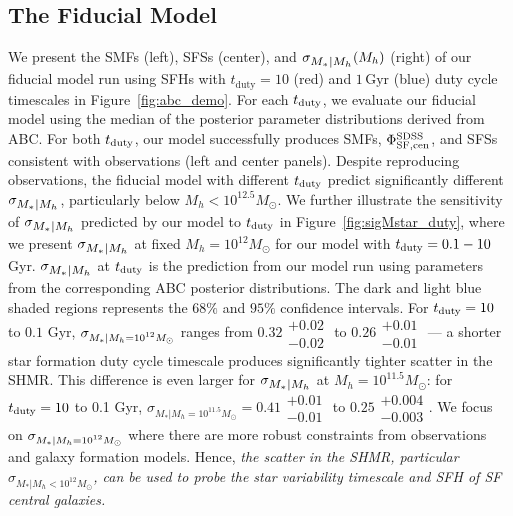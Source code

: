 \documentclass[12pt, letterpaper, preprint, tighten]{aastex62}
\newcommand{\edt}[1]{{\color{dred}{\bf} #1}}
\newcommand{\tduty}{t_{\rm duty}}
\newcommand{\siglogm}{\sigma_{\scaleto{M_*|M_h}{8pt}}}
\newcommand{\sigtwe}{\sigma_{\scaleto{M_*|M_h=10^{12}M_\odot}{8pt}}}
\begin{document}
\subsection{The Fiducial Model} \label{sec:sfdutycycle}
We present the SMFs (left), SFSs (center), and $\siglogm(M_h)$ (right) of our 
fiducial model run using SFHs with 
$t_\mathrm{duty}{=}10$ (red) and $1\,\mathrm{Gyr}$ (blue) duty cycle timescales 
in Figure~\ref{fig:abc_demo}. %
For each $\tduty$, we evaluate our fiducial model using the median of the posterior parameter 
distributions derived from ABC. For both $\tduty$, our model successfully produces 
SMFs, $\Phi^{\rm SDSS}_{\rm SF,cen}$, and SFSs consistent with observations (left 
and center panels). Despite reproducing observations, the fiducial model with different 
$t_{\rm duty}$ predict significantly different $\siglogm$, 
particularly below $M_h < 10^{12.5}M_\odot$. We further illustrate the sensitivity 
of $\siglogm$ predicted by our model to $\tduty$ in Figure~\ref{fig:sigMstar_duty}, 
where we present $\siglogm$ at fixed $M_h = 10^{12} M_\odot$ for our 
model with $t_{\rm duty} = 0.1 - 10$ Gyr. $\siglogm$ at $t_{\rm duty}$
is the prediction from our model run using parameters from the corresponding ABC 
posterior distributions. The dark and light blue shaded regions represents the 
$68\%$ and $95\%$ confidence intervals. For $t_{\rm duty} = 10$ to $0.1$ Gyr,
$\sigtwe$ ranges from $0.32\substack{+0.02\\ -0.02}$ to $0.26\substack{+0.01\\-0.01}$
--- a shorter star formation duty cycle timescale produces significantly
tighter scatter in the SHMR. 
\edt{
    This difference is even larger for $\siglogm$ at $M_h=10^{11.5}M_\odot$: for 
    $t_{\rm duty} = 10$ to 0.1 Gyr, $\sigma_{M_*|M_h=10^{11.5}M_\odot} = 0.41\substack{+0.01\\-0.01}$
    to $0.25\substack{+0.004\\-0.003}$. We focus on $\sigtwe$ where there are more
    robust constraints from observations and galaxy formation models. 
}
Hence, \emph{the scatter in the SHMR, particular $\sigma_{M_*|M_h < 10^{12}M_\odot}$, can be used to probe the star variability timescale and SFH of SF central galaxies.}
\end{document}
